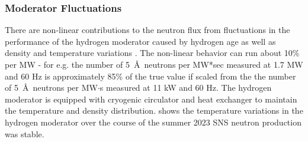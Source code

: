

\subsubsection{Moderator Fluctuations}


There are non-linear contributions to the neutron flux from fluctuations in the performance of the hydrogen moderator caused by hydrogen age as well as density and temperature variations \cite{Carpenter1977}. The non-linear behavior can run about 10\% per MW - for e.g. the number of 5~\AA\ neutrons per MW*sec measured at 1.7 MW and 60 Hz is approximately 85\% of  the true value if scaled from the the number of 5~\AA\ neutrons per MW$\cdot$s measured at 11 kW and 60 Hz. The hydrogen moderator is equipped with cryogenic circulator and heat exchanger to maintain the temperature and density distribution.  shows the temperature variations in the hydrogen moderator over the course of the summer 2023 SNS neutron production was stable. 

